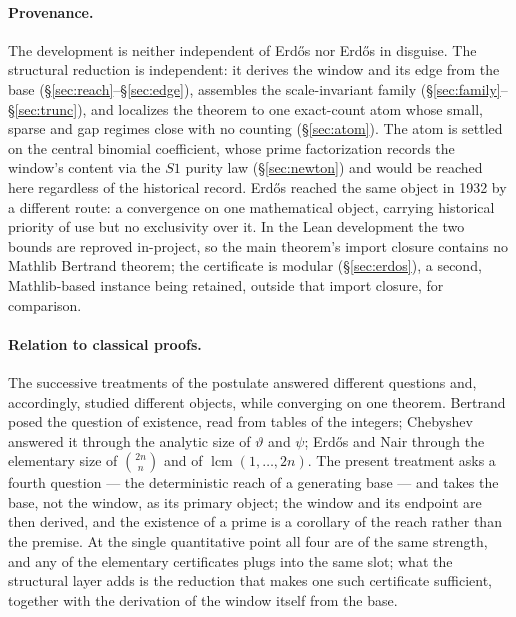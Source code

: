 \documentclass[11pt,a4paper]{amsart}
\theoremstyle{plain}
\theoremstyle{definition}
\theoremstyle{plain}
\theoremstyle{remark}
\begin{document}
\paragraph{Provenance.}
The development is neither independent of Erd\H{o}s nor Erd\H{o}s in disguise. The
structural reduction is independent: it derives the window and its edge from the base
(\S\ref{sec:reach}--\S\ref{sec:edge}), assembles the scale-invariant family
(\S\ref{sec:family}--\S\ref{sec:trunc}), and localizes the theorem to one exact-count atom
whose small, sparse and gap regimes close with no counting (\S\ref{sec:atom}). The atom is
settled on the central binomial coefficient, whose prime factorization records the window's
content via the $S1$ purity law (\S\ref{sec:newton}) and would be reached here regardless of
the historical record. Erd\H{o}s reached the same object in 1932 by a different route: a
convergence on one mathematical object, carrying historical priority of use but no exclusivity
over it. In the Lean development the two bounds are reproved in-project, so the main theorem's
import closure contains no Mathlib Bertrand theorem; the certificate is modular
(\S\ref{sec:erdos}), a second, Mathlib-based instance being retained, outside that import
closure, for comparison.

\paragraph{Relation to classical proofs.}
The successive treatments of the postulate answered different questions and, accordingly,
studied different objects, while converging on one theorem. Bertrand \cite{bertrand1845} posed
the question of existence, read from tables of the integers; Chebyshev \cite{chebyshev1852}
answered it through the analytic size of $\vartheta$ and $\psi$; Erd\H{o}s \cite{erdos1932} and
Nair \cite{nair1982} through the elementary size of $\binom{2n}{n}$ and of
$\operatorname{lcm}(1,\dots,2n)$. The present treatment asks a fourth question --- the
deterministic reach of a generating base --- and takes the base, not the window, as its primary
object; the window and its endpoint are then derived, and the existence of a prime is a
corollary of the reach rather than the premise. At the single quantitative point all four are
of the same strength, and any of the elementary certificates plugs into the same slot; what the
structural layer adds is the reduction that makes one such certificate sufficient, together with
the derivation of the window itself from the base.
\end{document}
